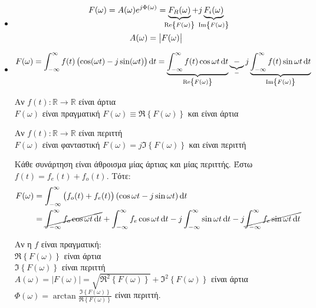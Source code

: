      \begin{itemize}

     \item
     \begin{gather*}
     F(\omega)= A(\omega )e^{j\Phi(\omega )} =
     \underbrace{F_R(\omega )}_{\mathclap{\Re\left\lbrace F(\omega ) \right\rbrace}}
     +j\underbrace{F_i(\omega )}_{\mathclap{\Im\left\lbrace F(\omega ) \right\rbrace}}
     \\ A(\omega )=\left| F(\omega ) \right|
     \end{gather*}
     \item
     \begin{gather*}
     F(\omega )=\int_{-\infty}^{\infty} f(t)\left(\cos(\omega t)-j\sin(\omega t)\right)
     \dif t = \underbrace{\int_{-\infty}^{\infty} f(t)\cos\omega t\dif t}_{%
        \Re\left\lbrace F(\omega ) \right\rbrace
        }
        \underbrace{-}_{-}
        j \underbrace{\int_{-\infty}^{\infty} f(t)\sin\omega t\dif t}_{%
            \Im\left\lbrace F(\omega ) \right\rbrace
            }
     \end{gather*}
     
     Αν \( f(t):\mathbb R \to\mathbb R  \) είναι άρτια\\
     \( F(\omega ) \) είναι πραγματική \quad \( 
     F(\omega ) \equiv \Re\left\lbrace F(\omega ) \right\rbrace
      \) και είναι άρτια
      
     Αν \( f(t):\mathbb R \to\mathbb R  \) είναι περιττή\\
     \( F(\omega ) \) είναι φανταστική \quad \( 
     F(\omega ) = j\Im \left\lbrace F(\omega) \right\rbrace
      \) και είναι περιττή
      
     Κάθε συνάρτηση είναι άθροισμα μίας άρτιας και μίας περιττής. Έστω
     \( f(t) = f_e(t)+f_o(t) \). Τότε:
     \begin{align*}
     F(\omega ) &= \int_{-\infty}^{\infty} \left(
     f_o(t)+f_e(t)
     \right)(\cos\omega t -j\sin \omega t)\dif t
     \\ &= \cancel{\int_{-\infty}^{\infty} f_o\cos\omega t\dif t}
     + \int_{-\infty}^{\infty} f_e\cos\omega t\dif t
     - j\int_{-\infty}^{\infty} \sin\omega t\dif t
     - j \cancel{\int_{-\infty}^{\infty} f_e\sin\omega t\dif t }
     \end{align*}
     
     Αν η \( f \) είναι πραγματική: \\
     \( \Re\left\lbrace F(\omega ) \right\rbrace \) είναι άρτια \\
     \( \Im\left\lbrace F(\omega ) \right\rbrace \) είναι περιττή \\
     \( A(\omega)=\left|F(\omega )\right| = 
     \sqrt{\Re^2\left\lbrace F(\omega ) \right\rbrace}
     +\Im^2\left\lbrace F(\omega) \right\rbrace
      \) είναι άρτια\\
      \( \Phi(\omega) =\arctan
      \frac{\Im\left\lbrace F(\omega) \right\rbrace}%
      {\Re\left\lbrace F(\omega ) \right\rbrace}
       \) είναι περιττή.
       

\end{itemize}
